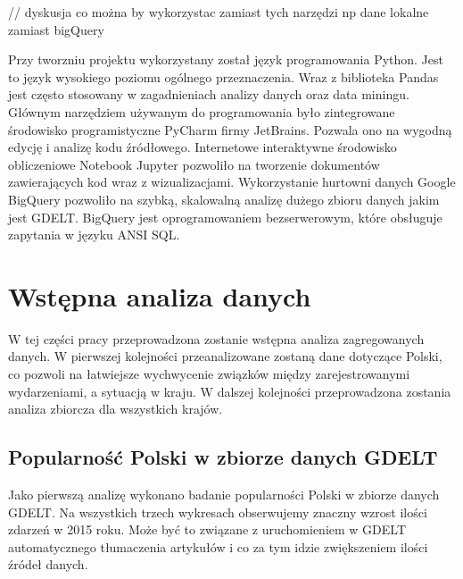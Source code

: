 \documentclass[11pt]{report}
\begin{document}
    // dyskusja co można by wykorzystac zamiast tych narzędzi np dane lokalne zamiast bigQuery

    Przy tworzniu projektu wykorzystany został język programowania Python.
    Jest to język wysokiego poziomu ogólnego przeznaczenia.
    Wraz z biblioteka Pandas jest często stosowany w zagadnieniach analizy danych oraz data miningu.
    Głównym narzędziem używanym do programowania było zintegrowane środowisko programistyczne PyCharm firmy JetBrains.
    Pozwala ono na wygodną edycję i analizę kodu źródłowego.
    Internetowe interaktywne środowisko obliczeniowe Notebook Jupyter pozwoliło na tworzenie dokumentów zawierających kod wraz z wizualizacjami.
    Wykorzystanie hurtowni danych Google BigQuery pozwoliło na szybką, skalowalną analizę dużego zbioru danych jakim jest GDELT.
    BigQuery jest oprogramowaniem bezserwerowym, które obsługuje zapytania w języku ANSI SQL.


    \section{Wstępna analiza danych}
    W tej części pracy przeprowadzona zostanie wstępna analiza zagregowanych danych. W pierwszej kolejności przeanalizowane zostaną dane dotyczące Polski, co pozwoli na łatwiejsze wychwycenie związków między zarejestrowanymi wydarzeniami, a sytuacją w kraju.
    W dalszej kolejności przeprowadzona zostania analiza zbiorcza dla wszystkich krajów.

    \subsection{Popularność Polski w zbiorze danych GDELT}
    Jako pierwszą analizę wykonano badanie popularności Polski w zbiorze danych GDELT. Na wszystkich trzech wykresach obserwujemy znaczny wzrost ilości zdarzeń w 2015 roku. Może być to związane z uruchomieniem w GDELT automatycznego tłumaczenia artykułów i co za tym idzie zwiększeniem ilości źródeł danych.
\end{document}
